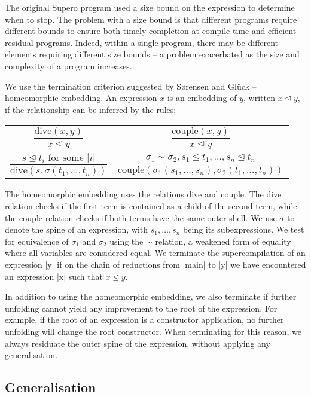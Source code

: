 The original Supero program used a size bound on the expression to determine when to stop. The problem with a size bound is that different programs require different bounds to ensure both timely completion at compile-time and efficient residual programs. Indeed, within a single program, there may be different elements requiring different size bounds -- a problem exacerbated as the size and complexity of a program increases.

We use the termination criterion suggested by S{\o}rensen and Gl{\"u}ck \cite{sorensen:supercompilation} -- homeomorphic embedding. An expression $x$ is an embedding of $y$, written $x \unlhd y$, if the relationship can be inferred by the rules:

\noindent\begin{tabular}{p{5cm}p{5cm}}
\[\frac{\text{dive}(x,y)}{x \unlhd y}\] \vspace{-8mm}
&
\[\frac{\text{couple}(x,y)}{x \unlhd y}\] \vspace{-8mm}
\\
\[\frac{s \unlhd t_i \text{ for some } |i|}{\text{dive}(s, \sigma(t_1,\ldots,t_n))} \]
&
\[\frac{\sigma_1 \sim \sigma_2,
        s_1 \unlhd t_1, \ldots , s_n \unlhd t_n}
       {\text{couple}(\sigma_1 (s_1,\ldots,s_n), \sigma_2 (t_1,\ldots,t_n))}
\]
\end{tabular}

The homeomorphic embedding uses the relations dive and couple. The dive relation checks if the first term is contained as a child of the second term, while the couple relation checks if both terms have the same outer shell. We use $\sigma$ to denote the spine of an expression, with $s_1,\ldots,s_n$ being its subexpressions. We test for equivalence of $\sigma_1$ and $\sigma_2$ using the $\sim$ relation, a weakened form of equality where all variables are considered equal. We terminate the supercompilation of an expression |y| if on the chain of reductions from |main| to |y| we have encountered an expression |x| such that $x \unlhd y$.

In addition to using the homeomorphic embedding, we also terminate if further unfolding cannot yield any improvement to the root of the expression. For example, if the root of an expression is a constructor application, no further unfolding will change the root constructor. When terminating for this reason, we always residuate the outer spine of the expression, without applying any generalisation.

\subsection{Generalisation}

